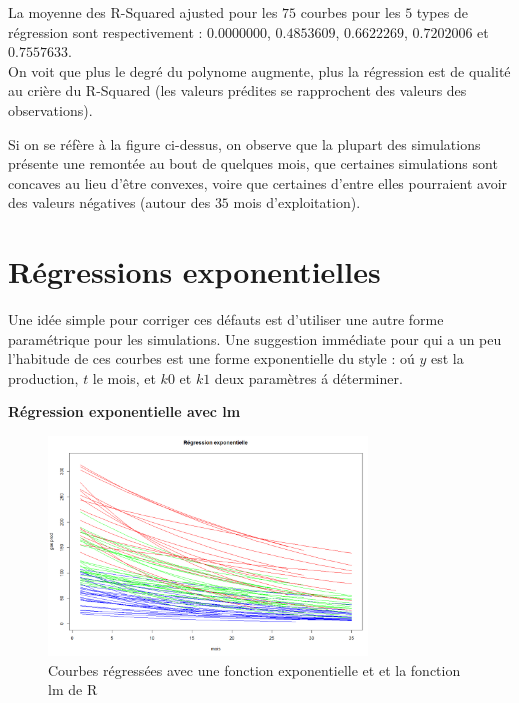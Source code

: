 \documentclass[12pt]{article}
\begin{document}
La moyenne des R-Squared ajusted pour les $75$ courbes pour les $5$ types de r\'egression sont respectivement : 
\newline
$0.0000000$, $0.4853609$, $0.6622269$, $0.7202006$ et $0.7557633$.
\newline
~\\
On voit que plus le degr\'e du polynome augmente, plus la r\'egression est de qualit\'e au cri\`ere du R-Squared (les valeurs pr\'edites se rapprochent des valeurs des observations).

Si on se r\'ef\`ere \`a la figure ci-dessus, on observe que la plupart des simulations
pr\'esente une remont\'ee au bout de quelques mois, que certaines simulations sont concaves
au lieu d'\^etre convexes, voire que certaines d'entre elles pourraient avoir des valeurs n\'egatives (autour des $35$ mois d'exploitation).

\newpage


\section{R\'egressions exponentielles}

Une id\'ee simple pour corriger ces d\'efauts est d'utiliser une autre forme param\'etrique pour
les simulations. Une suggestion imm\'ediate pour qui a un peu l'habitude de ces courbes est
une forme exponentielle du style : o\'u $y$ est la production, $t$ le mois, et $k0$ et
$k1$ deux param\`etres \'a d\'eterminer.

\textbf{R\'egression exponentielle avec lm}

\begin{figure}[H]
 \centering %
	\includegraphics[width=320px]{reg_exp_1}
  \caption{\label{fig:exponential_reg_lm} Courbes r\'egress\'ees avec une fonction exponentielle et et la fonction lm de R}
\end{figure}
\end{document}
